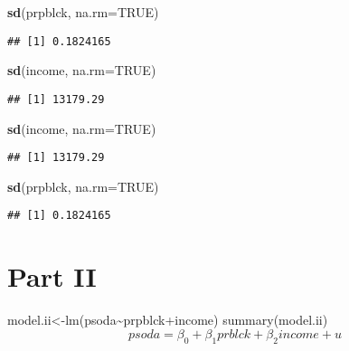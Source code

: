 \documentclass[]{article}
\newenvironment{Shaded}{\begin{snugshade}}{\end{snugshade}}
\newcommand{\KeywordTok}[1]{\textcolor[rgb]{0.13,0.29,0.53}{\textbf{#1}}}
\newcommand{\DataTypeTok}[1]{\textcolor[rgb]{0.13,0.29,0.53}{#1}}
\newcommand{\OtherTok}[1]{\textcolor[rgb]{0.56,0.35,0.01}{#1}}
\newcommand{\NormalTok}[1]{#1}
\begin{document}
\begin{Shaded}
\begin{Highlighting}[]
\KeywordTok{sd}\NormalTok{(prpblck, }
   \DataTypeTok{na.rm=}\OtherTok{TRUE}\NormalTok{)}
\end{Highlighting}
\end{Shaded}

\begin{verbatim}
## [1] 0.1824165
\end{verbatim}

\begin{Shaded}
\begin{Highlighting}[]
\KeywordTok{sd}\NormalTok{(income,}
   \DataTypeTok{na.rm=}\OtherTok{TRUE}\NormalTok{)}
\end{Highlighting}
\end{Shaded}

\begin{verbatim}
## [1] 13179.29
\end{verbatim}

\begin{Shaded}
\begin{Highlighting}[]
\KeywordTok{sd}\NormalTok{(income,}
   \DataTypeTok{na.rm=}\OtherTok{TRUE}\NormalTok{)}
\end{Highlighting}
\end{Shaded}

\begin{verbatim}
## [1] 13179.29
\end{verbatim}

\begin{Shaded}
\begin{Highlighting}[]
\KeywordTok{sd}\NormalTok{(prpblck,}
   \DataTypeTok{na.rm=}\OtherTok{TRUE}\NormalTok{)}
\end{Highlighting}
\end{Shaded}

\begin{verbatim}
## [1] 0.1824165
\end{verbatim}

\section{Part II}\label{part-ii}

model.ii\textless{}-lm(psoda\textasciitilde{}prpblck+income)
summary(model.ii) \[psoda=\beta_0 + \beta_1 prblck+ \beta_2 income +u\]
\end{document}
